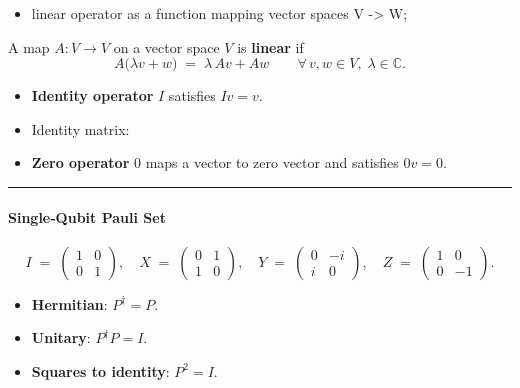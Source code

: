 \begin{itemize}
\tightlist
\item
  linear operator as a function mapping vector spaces V -\textgreater{}
  W;
\end{itemize}

A map \(A : V \rightarrow V\) on a vector space \(V\) is \textbf{linear}
if\\
\[
A\bigl(\lambda v + w\bigr) \;=\; \lambda\,A v + A w
\qquad\forall\, v,w\in V,\;\lambda\in\mathbb C .
\]

\begin{itemize}
\item
  \textbf{Identity operator} \(I\) satisfies \(I v = v\).
\item
  Identity matrix:
\item
  \textbf{Zero operator} \(0\) maps a vector to zero vector and
  satisfies \(0 v = 0\).
\end{itemize}

\begin{center}\rule{0.5\linewidth}{0.5pt}\end{center}

\hypertarget{singlequbit-pauli-set}{%
\paragraph{Single‑Qubit Pauli Set}\label{singlequbit-pauli-set}}

\[
I \;=\;
\begin{pmatrix}
1 & 0 \\
0 & 1
\end{pmatrix},
\quad
X \;=\;
\begin{pmatrix}
0 & 1 \\
1 & 0
\end{pmatrix},
\quad
Y \;=\;
\begin{pmatrix}
0 & -i \\
i & 0
\end{pmatrix},
\quad
Z \;=\;
\begin{pmatrix}
1 & 0 \\
0 & -1
\end{pmatrix}.
\]

\begin{itemize}
\tightlist
\item
  \textbf{Hermitian}: \(P^\dagger = P\).\\
\item
  \textbf{Unitary}: \(P^\dagger P = I\).\\
\item
  \textbf{Squares to identity}: \(P^{2}=I\).
\end{itemize}

